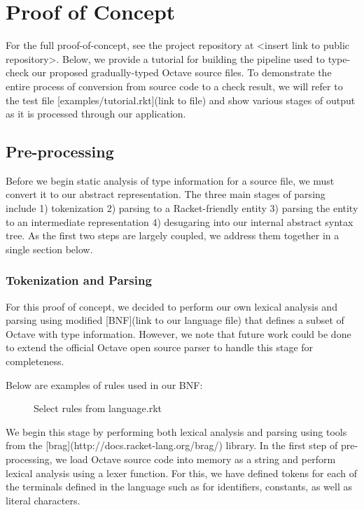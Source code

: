\section{Proof of Concept}
For the full proof-of-concept, see the project repository at <insert link to public repository>. Below, we provide a tutorial for building the pipeline used to type-check our proposed gradually-typed Octave source files. To demonstrate the entire process of conversion from source code to a check result, we will refer to the test file [examples/tutorial.rkt](link to file) and show various stages of output as it is processed through our application.

\subsection{Pre-processing}
Before we begin static analysis of type information for a source file, we must convert it to our abstract representation. The three main stages of parsing include 1) tokenization 2) parsing to a Racket-friendly entity 3) parsing the entity to an intermediate representation 4) desugaring into our internal abstract syntax tree. As the first two steps are largely coupled, we address them together in a single section below.

\subsubsection{Tokenization and Parsing}
For this proof of concept, we decided to perform our own lexical analysis and parsing using modified [BNF](link to our language file) that defines a subset of Octave with type information. However, we note that future work could be done to extend the official Octave open source parser \cite{johneaton2018octaveparser} to handle this stage for completeness.

Below are examples of rules used in our BNF:
\begin{figure}[h]
  \caption[]{Select rules from language.rkt}
\end{figure}

We begin this stage by performing both lexical analysis and parsing using tools from the [brag](http://docs.racket-lang.org/brag/) library. In the first step of pre-processing, we load Octave source code into memory as a string and perform lexical analysis using a lexer function. For this, we have defined tokens for each of the terminals defined in the language such as for identifiers, constants, as well as literal characters.

